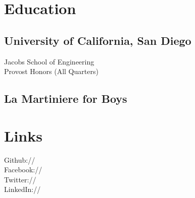 \documentclass[]{deedy-resume-openfont}
\begin{document}
%
%



%
%

\begin{minipage}[t]{0.31\textwidth} 


\section{Education} 

\subsection{University of California, San Diego}

Jacobs School of Engineering \\
Provost Honors (All Quarters) \\
\sectionsep
\sectionsep

\subsection{La Martiniere for Boys}
\sectionsep


\section{Links} 
Github:// \href{https://github.com/Keshav919}{} \\
Facebook:// \href{https://facebook.com/keshav.rungta.3}{}\\
Twitter://  \href{https://twitter.com/keshrunedscmu}{} \\
LinkedIn:// \href{https://www.linkedin.com/in/keshav-rungta-a29174152/}{} \\
\sectionsep

\end{minipage}
\end{document}
